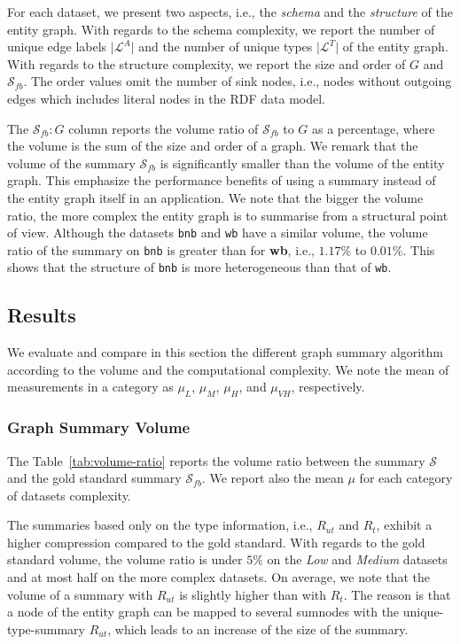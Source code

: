 For each dataset, we present two aspects, i.e., the \emph{schema} and the \emph{structure} of the entity graph. With regards to the schema complexity, we report the number of unique edge labels $\vert \mathcal{L}^A \vert$ and the number of unique types $\vert \mathcal{L}^T \vert$ of the entity graph. With regards to the structure complexity, we report the size and order of $G$ and  $\mathcal{S}_{fb}$. The order values omit the number of sink nodes, i.e., nodes without outgoing edges which includes literal nodes in the RDF data model.

The $\mathcal{S}_{fb}:G$ column reports the volume ratio of $\mathcal{S}_{fb}$ to $G$ as a percentage, where the volume is the sum of the size and order of a graph. We remark that the volume of the summary $\mathcal{S}_{fb}$ is significantly smaller than the volume of the entity graph. This emphasize the performance benefits of using a summary instead of the entity graph itself in an application. We note that the bigger the volume ratio, the more complex the entity graph is to summarise from a structural point of view. Although the datasets \texttt{bnb} and \texttt{wb} have a similar volume, the volume ratio of the summary on \texttt{bnb} is greater than for \textbf{wb}, i.e., $1.17\%$ to $0.01\%$. This shows that the structure of \texttt{bnb} is more heterogeneous than that of \texttt{wb}.



\subsection{Results}

We evaluate and compare in this section the different graph summary algorithm according to the volume and the computational complexity.
We note the mean of measurements in a category as $\mu_{L}$, $\mu_{M}$, $\mu_{H}$, and $\mu_{VH}$, respectively.

\subsubsection{Graph Summary Volume}

The Table~\ref{tab:volume-ratio} reports the volume ratio between the summary $\mathcal{S}$ and the gold standard summary $\mathcal{S}_{fb}$. We report also the mean $\mu$ for each category of datasets complexity.

The summaries based only on the type information, i.e., $R_{ut}$ and $R_t$, exhibit a higher compression compared to the gold standard. With regards to the gold standard volume, the volume ratio is under $5\%$ on the \emph{Low} and \emph{Medium} datasets and at most half on the more complex datasets. On average, we note that the volume of a summary with $R_{ut}$ is slightly higher than with $R_t$. The reason is that a node of the entity graph can be mapped to several sumnodes with the \gls{unique-type-summary} $R_{ut}$, which leads to an increase of the size of the summary.

